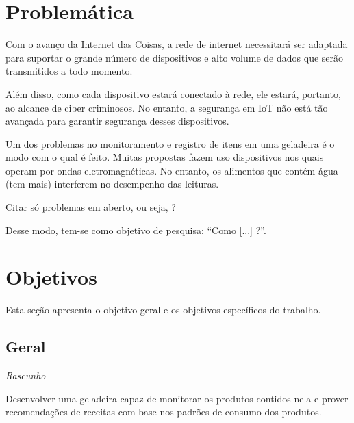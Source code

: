 \section{Problemática}

Com o avanço da Internet das Coisas, a rede de internet necessitará ser adaptada para suportar o grande número de dispositivos e alto volume de dados que serão transmitidos a todo momento.

Além disso, como cada dispositivo estará conectado à rede, ele estará, portanto, ao alcance de ciber criminosos. No entanto, a segurança em IoT não está tão avançada para garantir segurança desses dispositivos.

Um dos problemas no monitoramento e registro de itens em uma geladeira é o modo com o qual é feito. Muitas propostas fazem uso dispositivos nos quais operam por ondas eletromagnéticas. No entanto, os alimentos que contém água (tem mais) interferem no desempenho das leituras.

Citar só problemas em aberto, ou seja, ?


Desse modo, tem-se como objetivo de pesquisa: ``Como [...] ?''.

\section{Objetivos}
Esta seção apresenta o objetivo geral e os objetivos específicos do trabalho.

\subsection{Geral}

\textit{Rascunho}

Desenvolver uma geladeira capaz de monitorar os produtos contidos nela e prover recomendações de receitas com base nos padrões de consumo dos produtos.



